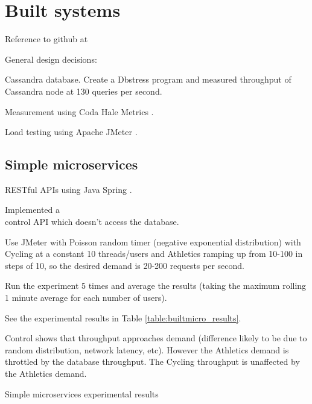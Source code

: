 %
%

\section{Built systems}

Reference to github at \cite{RN1073}

General design decisions:

Cassandra \cite{RN1050}\cite{RN1075} database.  Create a Dbstress program and measured throughput of Cassandra node at 130 queries per second.

Measurement using Coda Hale Metrics \cite{RN1079}.

Load testing using Apache JMeter \cite{RN1074}.

%
%
\subsection{Simple microservices}

RESTful APIs using Java Spring \cite{RN1076}.

Implemented a \\control API which doesn't access the database.

Use JMeter with Poisson random timer (negative exponential distribution) with Cycling at a constant 10 threads/users and Athletics ramping up from 10-100 in steps of 10, so the desired demand is 20-200 requests per second.

Run the experiment 5 times and average the results (taking the maximum rolling 1 minute average for each number of users).

See the experimental results in Table \ref{table:builtmicro_results}.

Control shows that throughput approaches demand (difference likely to be due to random distribution, network latency, etc).  However the Athletics demand is throttled by the database throughput.  The Cycling throughput is unaffected by the Athletics demand. 

\begin{table}[h!]
	\begin{center}
		\caption{Simple microservices experimental results}
		\label{table:builtmicro_results}
	\end{center}
\end{table}

